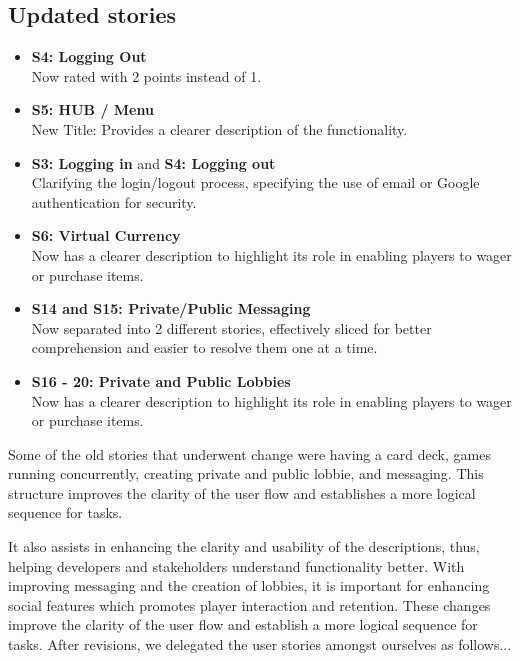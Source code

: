 \subsection{Updated stories}
\begin{itemize}
    \item \textbf{S4: Logging Out} \\
    Now rated with 2 points instead of 1.
    \item \textbf{S5: HUB / Menu} \\
    New Title: Provides a clearer description of the functionality.
    \item \textbf{S3: Logging in} and \textbf{S4: Logging out} \\
    Clarifying the login/logout process, specifying the use of email or Google authentication for security.
    \item \textbf{S6: Virtual Currency} \\
    Now has a clearer description to highlight its role in enabling players to wager or purchase items.
    \item \textbf{S14 and S15: Private/Public Messaging} \\
    Now separated into 2 different stories, effectively sliced for better comprehension and easier to resolve them one at a time.
    \item \textbf{S16 - 20: Private and Public Lobbies} \\
    Now has a clearer description to highlight its role in enabling players to wager or purchase items.
\end{itemize}
Some of the old stories that underwent change were having a card deck, games running concurrently, creating private and public lobbie, and messaging. This structure improves the clarity of the user flow and establishes a more logical sequence for tasks. 

It also assists in enhancing the clarity and usability of the descriptions, thus, helping developers and stakeholders understand functionality better. With improving messaging and the creation of lobbies, it is important for enhancing social features which promotes player interaction and retention. These changes improve the clarity of the user flow and establish a more logical sequence for tasks. After revisions, we delegated the user stories amongst ourselves as follows...

